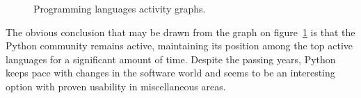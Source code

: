 \begin{figure}[ht]
  \begin{center}
  \end{center}
  \caption{Programming languages activity graphs.}
  \label{fig:ohloh_lang_graph}
\end{figure}
The obvious conclusion that may be drawn from the graph on figure~\ref{fig:ohloh_lang_graph} is that the Python community remains active, maintaining its position among the top active languages for a significant amount of time. Despite the passing years, Python keeps pace with changes in the software world and seems to be an interesting option with proven usability in miscellaneous areas. 

